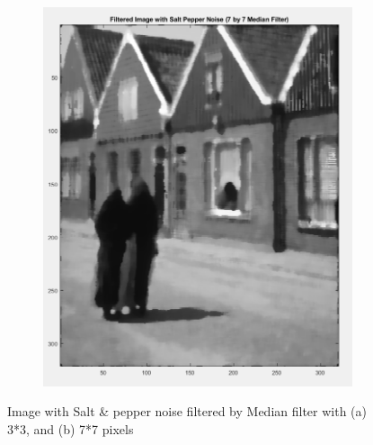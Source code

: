 \begin{figure}
\begin{subfigure}{0.4\textwidth}
        \includegraphics[width=\textwidth]{Resources/F9-b.png}
        \caption{}
        \label{fig:Second}
    \end{subfigure}
    \caption{Image with Salt \& pepper noise filtered by Median filter with (a) 3*3, and (b) 7*7 pixels}
    \label{fig:Salt and pepper noise filtered by median filter}
\end{figure}